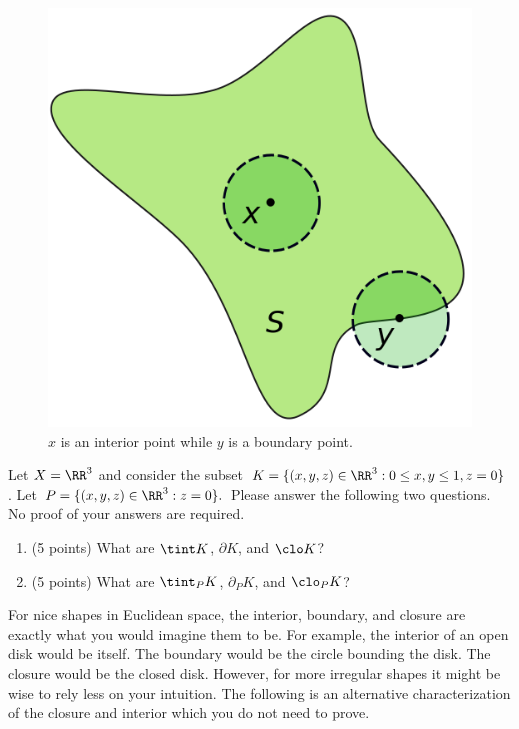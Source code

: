 \documentclass[11pt]{article}
\begin{document}
    \begin{figure}[h]
        \begin{center}
            \includegraphics[scale = 0.2]{../images/image3.png}
            \caption{$x$ is an interior point while $y$ is a boundary point.}
        \end{center}
    \end{figure}

    \begin{prob} [10 points]
        Let $X = \RR^3$ and consider the subset $K = \{(x, y, z) \in \RR^3 : 0 \leq x, y \leq 1, z = 0 \}$. Let $P = \{(x, y, z) \in \RR^3 : z = 0\}.$ Please answer the following two questions. No proof of your answers are required. 
        \begin{enumerate}[label = (\alph*)]
            \item (5 points) What are $\tint K$, $\partial K$, and $\clo K$?
            \item (5 points) What are $\tint_P K$, $\partial_P K$, and $\clo_P K$?
        \end{enumerate}
    \end{prob}
    For nice shapes in Euclidean space, the interior, boundary, and closure are exactly what you would imagine them to be. For example, the interior of an open disk would be itself. The boundary would be the circle bounding the disk. The closure would be the closed disk. However, for more irregular shapes it might be wise to rely less on your intuition. The following is an alternative characterization of the closure and interior which you do not need to prove. 
\end{document}
